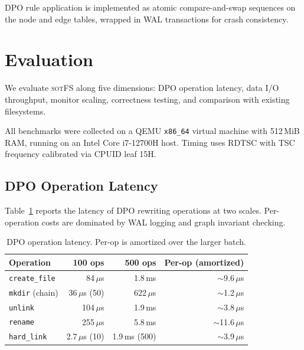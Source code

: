 \documentclass[11pt,a4paper]{article}
\theoremstyle{definition}
\theoremstyle{remark}
\newcommand{\sotfs}{\textsc{sotFS}}
\begin{document}
DPO rule application is implemented as atomic compare-and-swap
sequences on the node and edge tables, wrapped in WAL transactions
for crash consistency.

\section{Evaluation}
\label{sec:eval}

We evaluate \sotfs{} along five dimensions: DPO operation latency,
data I/O throughput, monitor scaling, correctness testing, and
comparison with existing filesystems.

All benchmarks were collected on a QEMU \texttt{x86\_64} virtual
machine with 512\,MiB RAM, running on an Intel Core i7-12700H host.
Timing uses RDTSC with TSC frequency calibrated via CPUID leaf 15H.

\subsection{DPO Operation Latency}
\label{sec:eval-dpo}

Table~\ref{tab:dpo-latency} reports the latency of DPO rewriting
operations at two scales. Per-operation costs are dominated by WAL
logging and graph invariant checking.

\begin{table}[H]
\centering
\caption{DPO operation latency. Per-op is amortized over the larger batch.}
\label{tab:dpo-latency}
\small
\begin{tabular}{@{}lrrr@{}}
\toprule
\textbf{Operation} & \textbf{100 ops} & \textbf{500 ops} & \textbf{Per-op (amortized)} \\
\midrule
\texttt{create\_file} & 84\,$\mu$s  & 1.8\,ms  & $\sim$9.6\,$\mu$s \\
\texttt{mkdir} (chain) & 36\,$\mu$s (50) & 622\,$\mu$s & $\sim$1.2\,$\mu$s \\
\texttt{unlink}        & 104\,$\mu$s & 1.9\,ms  & $\sim$3.8\,$\mu$s \\
\texttt{rename}        & 255\,$\mu$s & 5.8\,ms  & $\sim$11.6\,$\mu$s \\
\texttt{hard\_link}    & 2.7\,$\mu$s (10) & 1.9\,ms (500) & $\sim$3.9\,$\mu$s \\
\bottomrule
\end{tabular}
\end{table}
\end{document}
